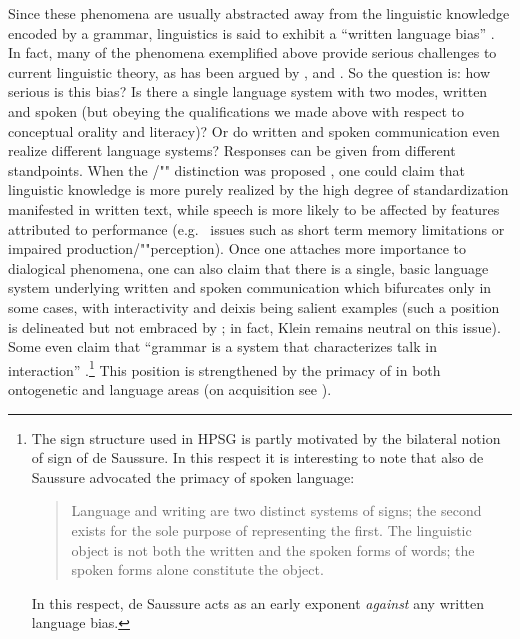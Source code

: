 \documentclass[output=paper
 	        ,biblatex
                ,babelshorthands
                ,newtxmath
                ,draftmode
                ,colorlinks, citecolor=brown
]{langscibook}
\begin{document}
Since these phenomena are usually abstracted away from the linguistic knowledge encoded by a grammar, linguistics is said to exhibit a \enquote{written language bias} \citep{Linell:2005}.
%
In fact, many of the phenomena exemplified above provide serious challenges  to current  linguistic theory, as has been argued by \citet{Ginzburg:2012}, \citet{Ginzburg:Poesio:2016} and \citet{Kempson:Cann:Gregoromichelaki:Chatzikyriakidis:2016}.
%
So the question is: how serious is this bias? 
%
Is there a single language system with two modes, written and spoken (but obeying the qualifications we made above with respect to conceptual orality and literacy)?
%
Or do written and spoken communication even realize different language systems?
%
Responses can be given from different standpoints. 
%
When the /""  distinction was proposed \citep{Chomsky:1969}, one could claim that linguistic knowledge is more purely realized by the high degree of standardization manifested in written text, while speech is more likely to be affected by features attributed to performance (e.g.\   issues such as short term memory limitations or impaired production/""perception).
%
Once one attaches more importance to dialogical phenomena, one can also claim that there is a single, basic language system underlying written and spoken communication which bifurcates only in some cases, with interactivity and deixis being salient examples (such a position is delineated but not embraced by ; in fact, Klein remains neutral on this issue). 
%
Some even claim that \enquote{grammar is a system that characterizes talk in interaction} \citep[]{Ginzburg:Poesio:2016}.\footnote{The sign structure used in HPSG is partly motivated by the bilateral notion of sign of de Saussure. In this respect it is interesting to note that also de Saussure advocated the primacy of spoken language:
\begin{quote}
Language and writing are two distinct systems of signs; the second exists for the sole purpose of
representing the first. The linguistic object is not both the written and the spoken forms of words;
the spoken forms alone constitute the object.  \citep[--24]{Saussure2011a}
\end{quote}
In this respect, de Saussure acts as an early exponent \emph{against} any written language bias.
}
%
This position is strengthened by the primacy of  in both ontogenetic and language  areas (on acquisition see ).
\end{document}
